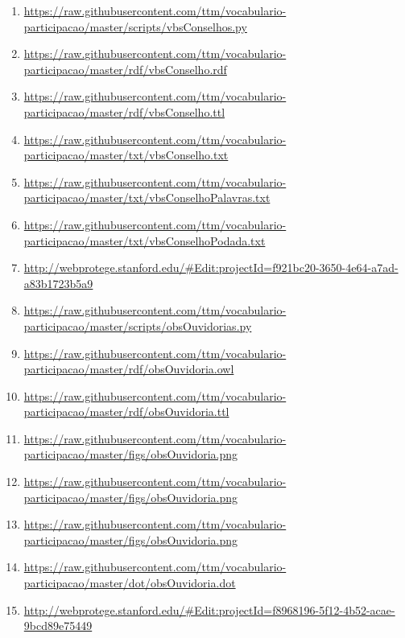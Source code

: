 \documentclass[12pt]{article}
\begin{document}
{\begin{enumerate}
    \item \url{https://raw.githubusercontent.com/ttm/vocabulario-participacao/master/scripts/vbsConselhos.py}\label{i:25}
    \item \url{https://raw.githubusercontent.com/ttm/vocabulario-participacao/master/rdf/vbsConselho.rdf}\label{i:26}
    \item \url{https://raw.githubusercontent.com/ttm/vocabulario-participacao/master/rdf/vbsConselho.ttl}\label{i:27}
    \item \url{https://raw.githubusercontent.com/ttm/vocabulario-participacao/master/txt/vbsConselho.txt}\label{i:28}
    \item \url{https://raw.githubusercontent.com/ttm/vocabulario-participacao/master/txt/vbsConselhoPalavras.txt}\label{i:29}
    \item \url{https://raw.githubusercontent.com/ttm/vocabulario-participacao/master/txt/vbsConselhoPodada.txt}\label{i:30}
    \item \url{http://webprotege.stanford.edu/#Edit:projectId=f921bc20-3650-4e64-a7ad-a83b1723b5a9}\label{i:30wp}

    \item \url{https://raw.githubusercontent.com/ttm/vocabulario-participacao/master/scripts/obsOuvidorias.py}\label{i:31}
    \item  \url{https://raw.githubusercontent.com/ttm/vocabulario-participacao/master/rdf/obsOuvidoria.owl}\label{i:32}
    \item  \url{https://raw.githubusercontent.com/ttm/vocabulario-participacao/master/rdf/obsOuvidoria.ttl}\label{i:33}
    \item \url{https://raw.githubusercontent.com/ttm/vocabulario-participacao/master/figs/obsOuvidoria.png}\label{i:34}
    \item \url{https://raw.githubusercontent.com/ttm/vocabulario-participacao/master/figs/obsOuvidoria.png}\label{i:35}
    \item \url{https://raw.githubusercontent.com/ttm/vocabulario-participacao/master/figs/obsOuvidoria.png}\label{i:36}
    \item  \url{https://raw.githubusercontent.com/ttm/vocabulario-participacao/master/dot/obsOuvidoria.dot}\label{i:37}
    \item  \url{http://webprotege.stanford.edu/#Edit:projectId=f8968196-5f12-4b52-acae-9bcd89e75449}\label{i:37wp}


\end{enumerate}}
\end{document}
